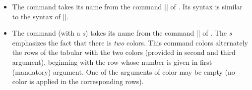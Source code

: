 \documentclass[dvipsnames]{article}%
\begin{document}
\begin{itemize}
\medskip
\begin{scope}
\hfuzz = 10cm
\begin{Code}[width=9cm]
$\begin{NiceArray}{lll}[hvlines] 
\CodeBefore
  \emph{\rowcolor{red!15}{1,3-5,8-}}
\Body
a_1 & b_1 & c_1 \\
a_2 & b_2 & c_2 \\
a_3 & b_3 & c_3 \\
a_4 & b_4 & c_4 \\
a_5 & b_5 & c_5 \\
a_6 & b_6 & c_6 \\
a_7 & b_7 & c_7 \\
a_8 & b_8 & c_8 \\
a_9 & b_9 & c_9 \\
a_{10} & b_{10} & c_{10} \\
\end{NiceArray}$
\end{Code}
$\begin{NiceArray}{lll}[baseline=4,hvlines,no-cell-nodes] 
\CodeBefore 
  \rowcolor{red!15}{1,3-5,8-}
\Body
a_1 & b_1 & c_1 \\
a_2 & b_2 & c_2 \\
a_3 & b_3 & c_3 \\
a_4 & b_4 & c_4 \\
a_5 & b_5 & c_5 \\
a_6 & b_6 & c_6 \\
a_7 & b_7 & c_7 \\
a_8 & b_8 & c_8 \\
a_9 & b_9 & c_9 \\
a_{10} & b_{10} & c_{10} \\
\end{NiceArray}$
\end{scope}


\bigskip
\item The command  takes its name from
the command |\columncolor| of . Its syntax is similar to the
syntax of |\rowcolor|.

\bigskip
\item The command  (with a \emph{s})
takes its name from the command |\rowcolors| of . The \emph{s}
emphasizes the fact that there is \emph{two} colors. This command colors
alternately the rows of the tabular with the two colors (provided in second
and third argument), beginning with the row whose number is given in first
(mandatory) argument. One of the arguments of color may be empty (no color is
applied in the corresponding rows).


\end{itemize}
\end{document}
